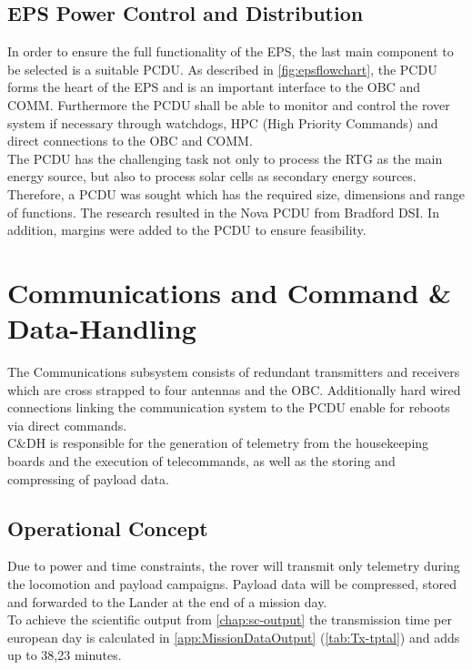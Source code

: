 \subsection{EPS Power Control and Distribution}
In order to ensure the full functionality of the EPS, the last main component to be selected is a suitable PCDU. As described in \autoref{fig:epsflowchart}, the PCDU forms the heart of the EPS and is an important interface to the OBC and COMM. Furthermore the PCDU shall be able to monitor and control the rover system if necessary through watchdogs, HPC (High Priority Commands) and direct connections to the OBC and COMM.\\
The PCDU has the challenging task not only to process the RTG as the main energy source, but also to process solar cells as secondary energy sources. Therefore, a PCDU was sought which has the required size, dimensions and range of functions. The research resulted in the Nova PCDU from Bradford DSI. In addition, margins were added to the PCDU to ensure feasibility\cite{BradfordSpace.2019}.

\section{Communications and Command \& Data-Handling}
\label{sec:comm}
The Communications subsystem consists of redundant transmitters and receivers which are cross strapped to four antennas and the OBC. Additionally hard wired connections linking the communication system to the PCDU enable for reboots via direct commands.\\
C\&DH is responsible for the generation of telemetry from the housekeeping boards and the execution of telecommands, as well as the storing and compressing of payload data. 

\subsection{Operational Concept}

Due to power and time constraints, the rover will transmit only telemetry during the locomotion and payload campaigns. Payload data will be compressed, stored and forwarded to the Lander at the end of a mission day. \\ 
 
To achieve the scientific output from \autoref{chap:sc-output} the transmission time per european day is calculated in \autoref{app:MissionDataOutput} (\autoref{tab:Tx-tptal}) and adds up to 38,23 minutes. 
	
